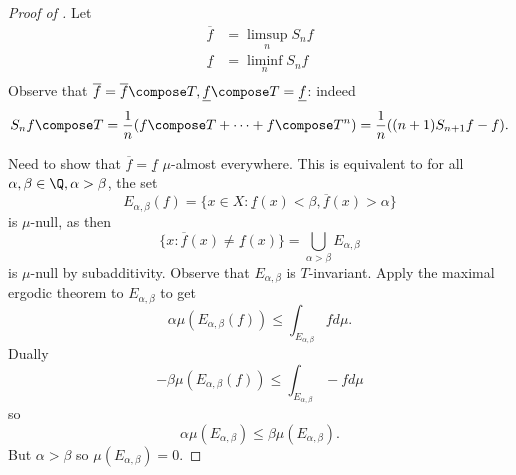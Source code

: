 \documentclass[a4paper]{article}
\begin{document}
\begin{proof}[Proof of ]
  Let
  \begin{align*}
    \overline f &= \limsup_n S_nf \\
    \underline f &= \liminf_n S_nf \\
  \end{align*}
  Observe that \(\overline f = \overline f \compose T, \underline f \compose T = \underline f\): indeed
  \[
    S_nf \compose T
    = \frac{1}{n}(f \compose T + \dots + f \compose T^n)
  = \frac{1}{n} ((n + 1)S_{n + 1}f - f).
  \]

  Need to show that \(\overline f = \underline f\) \(\mu\)-almost everywhere. This is equivalent to for all \(\alpha, \beta \in \Q, \alpha > \beta\), the set
  \[
    E_{\alpha, \beta}(f) = \{x \in X: \underline f(x) < \beta, \overline f(x) > \alpha\}
  \]
  is \(\mu\)-null, as then
  \[
    \{x: \overline f(x) \neq \underline f(x)\} = \bigcup_{\alpha > \beta} E_{\alpha, \beta}
  \]
  is \(\mu\)-null by subadditivity. Observe that \(E_{\alpha, \beta}\) is \(T\)-invariant. Apply the maximal ergodic theorem to \(E_{\alpha, \beta}\) to get
  \[
    \alpha \mu(E_{\alpha, \beta}(f)) \leq \int_{E_{\alpha, \beta}} f d\mu.
  \]
  Dually
  \[
    -\beta \mu(E_{\alpha, \beta}(f)) \leq \int_{E_{\alpha, \beta}} -f d\mu
  \]
  so
  \[
    \alpha \mu(E_{\alpha, \beta}) \leq \beta \mu(E_{\alpha, \beta}).\]
  But \(\alpha > \beta\) so \(\mu(E_{\alpha, \beta}) = 0\).


\end{proof}
\end{document}
